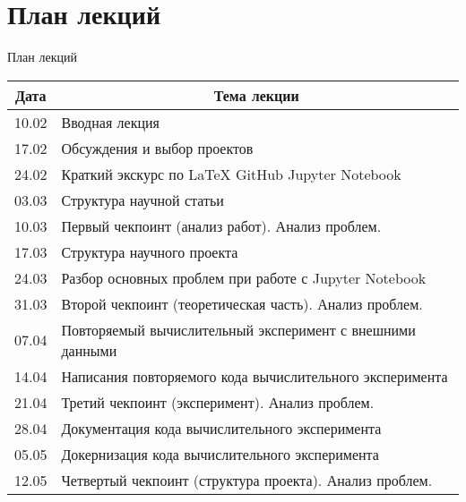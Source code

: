 \documentclass[10pt,pdf,hyperref={unicode}]{beamer}
\begin{document}
\section{План лекций}
\begin{frame}{План лекций}
\bigskip
\begin{table}[]
\begin{tabular}{|c|l|}
\hline
\textbf{Дата} & \multicolumn{1}{c|}{\textbf{Тема лекции}}                 \\ \hline
10.02         & Вводная лекция                                            \\ \hline
17.02         & Обсуждения и выбор проектов                               \\ \hline
24.02         & Краткий экскурс по LaTeX  GitHub Jupyter Notebook         \\ \hline
03.03         & Структура научной статьи                                  \\ \hline
10.03         & Первый чекпоинт (анализ работ). Анализ проблем.           \\ \hline
17.03         & Структура научного проекта                                \\ \hline
24.03         & Разбор основных проблем при работе с Jupyter Notebook     \\ \hline
31.03         & Второй чекпоинт (теоретическая часть). Анализ проблем.    \\ \hline
07.04         & Повторяемый вычислительный эксперимент с внешними данными \\ \hline
14.04         & Написания повторяемого кода вычислительного эксперимента  \\ \hline
21.04         & Третий чекпоинт (эксперимент). Анализ проблем.            \\ \hline
28.04         & Документация кода вычислительного эксперимента            \\ \hline
05.05         & Докернизация кода вычислительного эксперимента            \\ \hline
12.05         & Четвертый чекпоинт (структура проекта). Анализ проблем.   \\ \hline
\end{tabular}
\end{table}
\end{frame}

\end{document}
